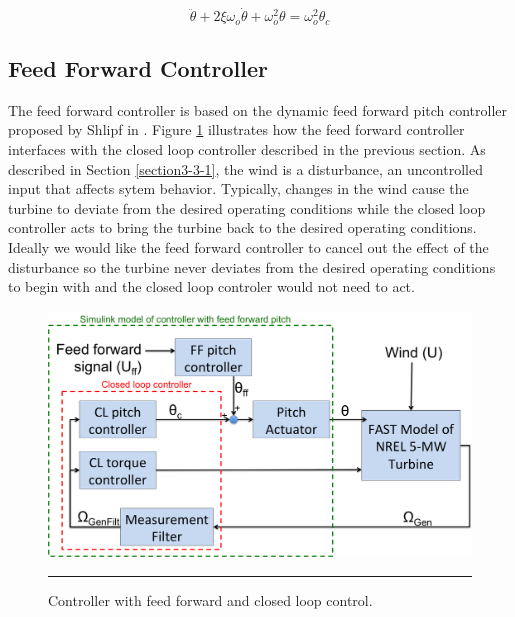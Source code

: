 \begin{equation}
	\ddot{\theta } + 2\xi \omega_o \dot{\theta} + \omega_{o}^{2}\theta = \omega_{o}^{2}\theta_c \label{eq3-1}
\end{equation}




\subsection{Feed Forward Controller} \label{section3-3-3}

The feed forward controller is based on the dynamic feed forward pitch controller proposed by Shlipf in \cite{schlipf2010}. Figure \ref{fig3-10} illustrates how the feed forward controller interfaces with the closed loop controller described in the previous section. As described in Section \ref{section3-3-1}, the wind is a disturbance, an uncontrolled input that affects sytem behavior. Typically, changes in the wind cause the turbine to deviate from the desired operating conditions while the closed loop controller acts to bring the turbine back to the desired operating conditions. Ideally we would like the feed forward controller to cancel out the effect of the disturbance so the turbine never deviates from the desired operating conditions to begin with and the closed loop controler would not need to act.

 \begin{figure}[htbp]
	\centering
		\includegraphics[width=\linewidth]{Figures/ch3Figures/fig3-10.png}
		\rule{35em}{0.5pt}
	\caption{Controller with feed forward and closed loop control.}
	\label{fig3-10}
\end{figure}

